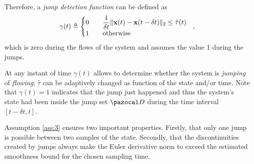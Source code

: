 %
Therefore, a \textit{jump detection function} can be defined as
%
\begin{equation}
    \gamma(t)\triangleq \left\{ 
        \begin{matrix*}[l]\vspace{1pt}
            0&&\dfrac{1}{\delta t}\|\x(t)-\x(t-\delta t)\|_2 \leq \hat{\tau}(t)\\
            1&&\text{otherwise}
        \end{matrix*}
    \right.~~,
\end{equation}
%	
which is zero during the flows of the system and assumes the value 1 during the jumps.

At any instant of time $\gamma(t)$ allows to determine whether the system is \textit{jumping} of \textit{flowing};
 $\hat{\tau}$ can be adaptively changed as function of the state and/or time.
Note that $\gamma(t)=1$ indicates that the jump just happened and thus the system's state had been inside the jump set $\D$ during the time interval $[t-\delta t,t]$.
%
\begin{rem}
    Assumption \ref{ass:3} ensures two important properties. Firstly, that only one jump is possible between two samples of the state. Secondly, that the discontinuities created by jumps always make the Euler derivative norm to exceed the estimated smoothness bound for the chosen sampling time. 
\end{rem}
%
\clearpage
